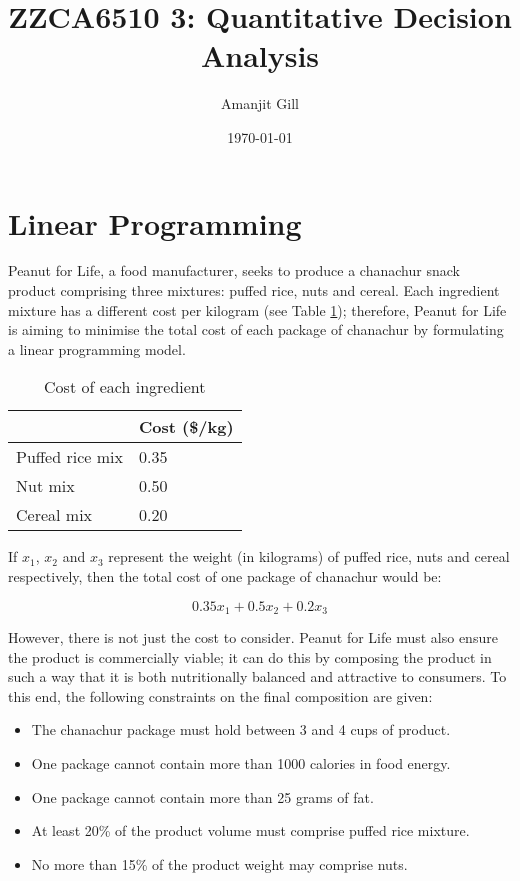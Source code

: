 \documentclass[11pt, a4paper]{article}
\title{\Large\bfseries ZZCA6510 3: Quantitative Decision Analysis}
\author{\large Amanjit Gill}
\date{\small \today}
\begin{document}
    
    \maketitle

    \newpage

    \section{Linear Programming}

    Peanut for Life, a food manufacturer, seeks to produce a chanachur snack product comprising three mixtures: puffed rice, nuts and cereal. Each ingredient mixture has a different cost per kilogram (see Table \ref{t1}); therefore, Peanut for Life is aiming to minimise the total cost of each package of chanachur by formulating a linear programming model. 
    
    \begin{table}[!ht]
        \centering
        \begin{tabular}{|l|l|}
            \hline
            ~ & Cost (\$/kg) \\ \hline
            Puffed rice mix& 0.35 \\ \hline
            Nut mix & 0.50 \\ \hline
            Cereal mix & 0.20 \\ \hline          
        \end{tabular}
        \caption{Cost of each ingredient}
        \label{t1}
    \end{table}
    
    
    If $x_{1}$, $x_{2}$ and $x_{3}$ represent the weight (in kilograms) of puffed rice, nuts and cereal respectively, then the total cost of one package of chanachur would be:

    $$ 0.35x_1 + 0.5x_2 + 0.2x_3 $$

    However, there is not just the cost to consider. Peanut for Life must also ensure the product is commercially viable; it can do this by composing the product in such a way that it is both nutritionally balanced and attractive to consumers. To this end, the following constraints on the final composition are given:

    \begin{itemize}
        \item The chanachur package must hold between 3 and 4 cups of product.
        \item One package cannot contain more than 1000 calories in food energy.
        \item One package cannot contain more than 25 grams of fat.
        \item At least 20\% of the product volume must comprise puffed rice mixture.
        \item No more than 15\% of the product weight may comprise nuts.
    \end{itemize}
\end{document}
